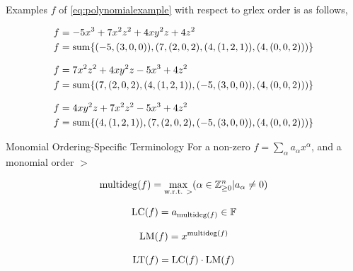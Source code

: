 \documentclass[aspectratio=169, handout, 10pt, hyperref=colorlinks]{beamer}
\begin{document}
\begin{frame}{Examples}
$f$ of \ref{eq:polynomialexample} with  respect to grlex order is as follows,
\begin{example}
    \begin{equation}
    \begin{aligned}
        f&=-5x^3+7x^2z^2+4xy^2z+4z^2\\
        f&=\operatorname{sum}\{(-5,(3,0,0)), (7,(2,0,2), (4,(1,2,1)), (4,(0,0,2)))\}
    \end{aligned}
    \end{equation}
\end{example}
\begin{example}
    \begin{equation}
    \begin{aligned}
        f&=7x^2z^2+4xy^2z-5x^3+4z^2\\
        f&=\operatorname{sum}\{(7,(2,0,2), (4,(1,2,1)), (-5,(3,0,0)), (4,(0,0,2)))\}
    \end{aligned}
    \end{equation}
\end{example}
\begin{example}
    \begin{equation}
    \begin{aligned}
        f&=4xy^2z+7x^2z^2-5x^3+4z^2\\
        f&=\operatorname{sum}\{(4,(1,2,1)), (7,(2,0,2), (-5,(3,0,0)), (4,(0,0,2)))\}
    \end{aligned}
    \end{equation}
\end{example}
\end{frame}
\begin{frame}{Monomial Ordering-Specific Terminology}
For a non-zero $f=\sum_\alpha a_\alpha x^\alpha$, and a monomial order $>$
\begin{defn}[multidegree of $f$]
    \begin{equation}
        \operatorname{multideg}(f)=\max_{\text{w.r.t. $>$}}(\alpha\in\mathbb{Z}^n_{\geq0} | a_\alpha \neq0)
    \end{equation}
\end{defn}
\begin{defn}
        \begin{equation}
            \operatorname{LC}(f)= a_{\operatorname{multideg}(f)} \in \mathbb{F}
        \end{equation}
\end{defn}
\begin{defn}
        \begin{equation}
            \operatorname{LM}(f)= x^{\operatorname{multideg}(f)}
        \end{equation}
\end{defn}
\begin{defn}
        \begin{equation}
            \operatorname{LT}(f)= \operatorname{LC}(f)\cdot \operatorname{LM}(f) 
        \end{equation}
\end{defn}
\end{frame}
\end{document}
